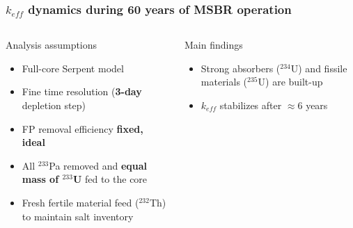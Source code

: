 \begin{frame}
\frametitle{$k_{eff}$ dynamics during 60 years of MSBR operation}
\vspace{-3mm}
\begin{columns}
	\column{4.3cm}
	\begin{block}{Analysis assumptions}
		\fontsize{7}{9}\selectfont
		\begin{itemize}
			\item Full-core Serpent model
			\item Fine time resolution (\textbf{3-day} depletion step)
			\item FP removal efficiency \textbf{fixed, ideal}
			\item All $^{233}$Pa removed and \textbf{equal mass of $^{233}$U} 
			fed to the core
			\item Fresh fertile material feed ($^{232}$Th) to maintain salt 
			inventory
		\end{itemize}
	\end{block}
	\vspace{-2mm}
	\begin{block}{Main findings}
	\fontsize{7}{9}\selectfont
	\begin{itemize}
		\item Strong absorbers ($^{234}$U) and fissile materials ($^{235}$U) 
		are built-up
		\item $k_{eff}$ stabilizes after $\approx6$ years
	\end{itemize}  
	\end{block}  	
	

\end{columns}
\end{frame}

